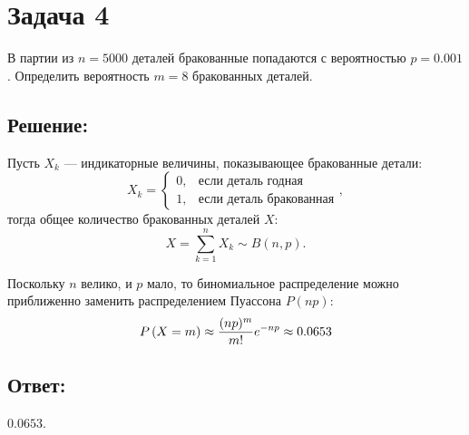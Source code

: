 \section*{Задача 4}

В партии из $n = 5000$ деталей бракованные попадаются с вероятностью $p = 0.001$. Определить вероятность $m=8$ бракованных деталей.

\subsection*{Решение:}

Пусть $X_k$ --- индикаторные величины, показывающее бракованные детали:
\begin{equation}
    X_k
    = \left \{
    \begin{array}{ll}
        0, & \text{если деталь годная}      \\
        1, & \text{если деталь бракованная}
    \end{array}
    \right .
    ,
\end{equation}
тогда общее количество бракованных деталей $X$:
\begin{equation}
    X = \sum_{k=1}^n X_k \sim B \left ( n, p \right ).
\end{equation}

Поскольку $n$ велико, и $p$ мало, то биномиальное распределение можно приближенно заменить распределением Пуассона $P(np)$:
\begin{equation}
    P \left ( X = m \right )
    \approx \frac{(np)^m}{m!} e^{-np}
    \approx 0.0653
\end{equation}

\subsection*{Ответ:}
$0.0653$.


